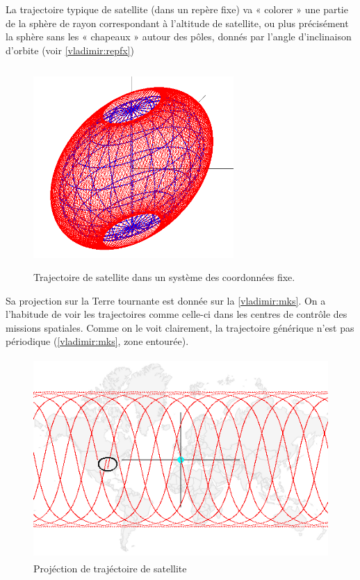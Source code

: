 La trajectoire typique de satellite (dans un rep\`ere fixe) va « colorer » une partie de
la sph\`ere de rayon correspondant \`a l'altitude de satellite, ou plus pr\'ecis\'ement la sph\`ere
sans les « chapeaux » autour des p\^oles, donn\'es par l'angle d'inclinaison d'orbite
(voir \autoref{vladimir:repfx})
 \begin{figure}[htp] \centering
     \includegraphics*[width=3in, height=3in]{repfx.png}
      \caption{
            \label{vladimir:repfx}
Trajectoire de satellite dans un syst\`eme des coordonn\'ees fixe. }
 \end{figure}
Sa projection sur la Terre tournante est donn\'ee sur la \autoref{vladimir:mks}. 
On a l'habitude de voir les trajectoires comme celle-ci dans les
centres de contr\^ole des missions spatiales.
 Comme on le voit clairement, la trajectoire g\'en\'erique n'est pas p\'eriodique
 (\autoref{vladimir:mks}, zone entourée).


\begin{figure}[htp] \centering
      \includegraphics*[height=3in]{mks.png}
      \caption{
            \label{vladimir:mks}
Proj\'ection de traj\'ectoire de satellite}
 \end{figure}
 


